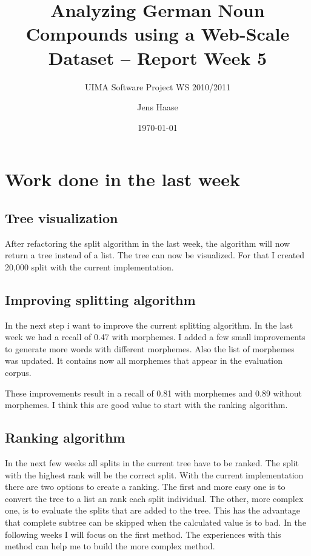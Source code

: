 \documentclass[11pt, accentcolor=tud9b, nochapname]{tudexercise}
\begin{document}
\author{Jens Haase}
\title{Analyzing German Noun Compounds using a
  Web-Scale Dataset -- Report Week 5}
\subtitle{UIMA Software Project WS 2010/2011}
\date{\today}
\maketitle

\section{Work done in the last week}

\subsection{Tree visualization}
After refactoring the split algorithm in the last week, the algorithm will now return a tree instead of a list. The tree can now be visualized. For that I created 20,000 split with the current implementation.

\subsection{Improving splitting algorithm}
In the next step i want to improve the current splitting algorithm. In the last week we had a recall of 0.47 with morphemes. I added a few small improvements to generate more words with different morphemes. Also the list of morphemes was updated. It contains now all morphemes that appear in the evaluation corpus.

These improvements result in a recall of 0.81 with morphemes and 0.89 without morphemes. I think this are good value to start with the ranking algorithm.

\subsection{Ranking algorithm}
In the next few weeks all splits in the current tree have to be ranked. The split with the highest rank will be the correct split. With the current implementation there are two options to create a ranking. The first and more easy one is to convert the tree to a list an rank each split individual. The other, more complex one, is to evaluate the splits that are added to the tree. This has the advantage that complete subtree can be skipped when the calculated value is to bad. In the following weeks I will focus on the first method. The experiences with this method can help me to build the more complex method.
\end{document}
